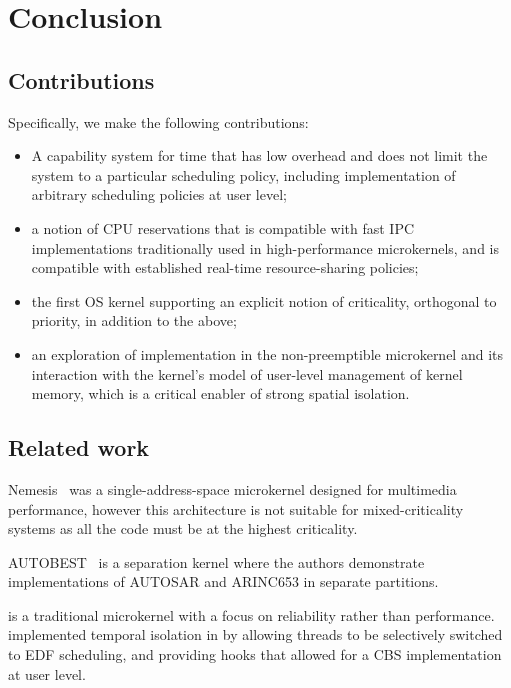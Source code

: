 \chapter{Conclusion}
\label{chap:conclusion}

\section{Contributions}

Specifically, we make the following contributions:
\begin{itemize}
\item A capability system for time that has low overhead and does not
  limit the system to a particular scheduling policy, including
  implementation of arbitrary scheduling policies at user level;
\item a notion of CPU reservations that is compatible with
  fast IPC implementations traditionally used in high-performance
  microkernels, and is compatible with established real-time resource-sharing policies;
\item the first OS kernel supporting an explicit notion of
  criticality, orthogonal to priority, in addition to the above;
\item an exploration of implementation in the non-preemptible \selfour
  microkernel and its interaction with the kernel's model of
  user-level management of kernel memory, which is a critical enabler
  of strong spatial isolation.
\end{itemize}

\section{Related work}

Nemesis~\citep{Leslie_MBRBEFH_96} was a single-address-space microkernel designed for multimedia
performance, however this architecture is not suitable for mixed-criticality systems as all the
code must be at the highest criticality.



AUTOBEST~\citep{Zuepke_BL_15} is a separation kernel where the authors demonstrate implementations of
AUTOSAR and ARINC653 in separate partitions.

\minix is a traditional microkernel with a focus on 
     reliability rather than performance. \citet{Herder_BGHT_06} implemented temporal isolation in
     \minix by allowing threads to be selectively switched to \gls{EDF} scheduling, and providing
     hooks that allowed for a \gls{CBS} implementation at user level. %

